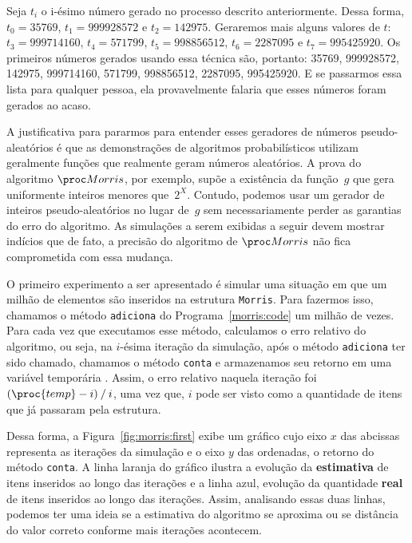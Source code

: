 Seja $t_i$ o i-ésimo número gerado no processo descrito anteriormente. Dessa forma, $t_0 = 35769$, $t_1 = 999928572$ e 
$t_2 = 142975$. Geraremos mais alguns valores de $t$: $t_3 = 999714160$, $t_4 = 571799$, $t_5 = 998856512$, 
$t_6 = 2287095$ e $t_7 = 995425920$. Os primeiros números gerados usando essa técnica são, portanto: 35769, 999928572, 
142975, 999714160, 571799, 998856512, 2287095, 995425920. E se passarmos essa lista para qualquer pessoa, ela 
provavelmente falaria que esses números foram gerados ao acaso.

A justificativa para pararmos para entender esses geradores de números pseudo-aleatórios é que as demonstrações de 
algoritmos probabilísticos utilizam geralmente funções que realmente geram números aleatórios. A prova do algoritmo 
$\Morris$, por exemplo, supõe a existência da função~$g$ que gera uniformente inteiros menores que~$2^X$. Contudo, 
podemos usar um gerador de inteiros pseudo-aleatórios no lugar de~$g$ sem necessariamente perder as garantias do erro
do algoritmo. As simulações a serem exibidas a seguir devem mostrar indícios que de fato, a precisão do algoritmo de 
$\Morris$ não fica comprometida com essa mudança.

O primeiro experimento a ser apresentado é simular uma situação em que um milhão de elementos são inseridos na estrutura 
\texttt{Morris}. Para fazermos isso, chamamos o método \texttt{adiciona} do Programa~\ref{morris:code} um milhão de 
vezes. Para cada vez que executamos esse método, calculamos o erro relativo do algoritmo, ou seja, na $i$-ésima 
iteração da simulação, após o método \texttt{adiciona} ter sido chamado, chamamos o método \texttt{conta} e armazenamos 
seu retorno em uma variável temporária . Assim, o erro relativo naquela iteração foi 
$(\proc{temp} - i) \mathbin{/} i$, uma vez que, $i$ pode ser visto como a quantidade de itens que já passaram pela 
estrutura.

Dessa forma, a Figura~\ref{fig:morris:first} exibe um gráfico cujo eixo $x$ das abcissas representa as iterações da 
simulação e o eixo $y$ das ordenadas, o retorno do método \texttt{conta}. A linha laranja do gráfico ilustra a evolução 
da \textbf{estimativa} de itens inseridos ao longo das iterações e a linha azul, evolução da quantidade \textbf{real} de 
itens inseridos ao longo das iterações. Assim, analisando essas duas linhas, podemos ter uma ideia se a estimativa do 
algoritmo se aproxima ou se distância do valor correto conforme mais iterações acontecem.

